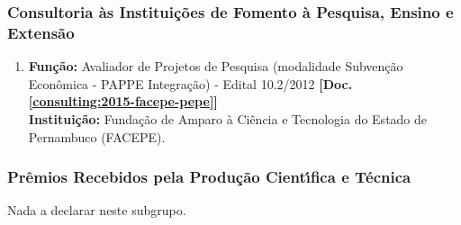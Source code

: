 \documentclass[a4paper,oneside,10pt]{article}
\begin{document}
\begin{enumerate}
%

\end{enumerate}


\subsubsection{Consultoria \`{a}s Institui\c{c}\~{o}es de Fomento \`{a} Pesquisa, Ensino e Extens\~{a}o}
\vspace{0.3cm}

\begin{enumerate}
\renewcommand{\labelenumi}{{\large\bfseries\arabic{enumi}.}}

\item   \textbf{Fun\c{c}\~{a}o:} Avaliador de Projetos de Pesquisa (modalidade Subven\c{c}\~{a}o Econ\^{o}mica - PAPPE Integra\c{c}\~{a}o) - Edital 10.2/2012 \textbf{[Doc. \ref{consulting:2015-facepe-pepe}]}\\
        \textbf{Institui\c{c}\~{a}o:} Fundação de Amparo à Ciência e Tecnologia do Estado de Pernambuco (FACEPE).


\end{enumerate}


\subsubsection{Pr\^{e}mios Recebidos pela Produ\c{c}\~{a}o Cient\'{\i}fica e T\'{e}cnica}
\vspace{0.3cm}

Nada a declarar neste subgrupo.

%
%
\end{document}
